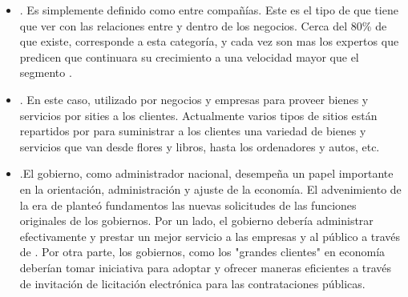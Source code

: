 \begin{itemize}
	\item \textbf{\btob}. Es simplemente definido como \ecommerce entre compañías. Este es el tipo de \ecommerce que tiene que ver con las relaciones entre y dentro de los negocios. Cerca del 80\% de \ecommerce que existe, corresponde a esta categoría, y cada vez son mas los expertos que predicen que \btob \ecommerce continuara su crecimiento a una velocidad mayor que el segmento \btoc.


	\item \textbf{\btoc}. En este caso, \internet utilizado por negocios y empresas para proveer bienes y servicios por sities \web a los clientes. Actualmente varios tipos de sitios \web \btoc están repartidos por \internet para suministrar a los clientes una variedad de bienes y servicios que van desde flores y libros, hasta los ordenadores y autos, etc.

	\item \textbf{\btog}.El gobierno, como administrador nacional, desempeña un papel importante en la orientación, administración y ajuste de la economía. El advenimiento de la era de \ecommerce planteó fundamentos \ecommerce las nuevas solicitudes de las funciones originales de los gobiernos. Por un lado, el gobierno debería  administrar \emarket efectivamente y prestar un mejor servicio a las empresas y al público a través de \egoverment. Por otra parte, los gobiernos, como los "grandes clientes" en economía deberían tomar iniciativa para adoptar \ecommerce y ofrecer maneras eficientes a través de invitación de licitación electrónica para las contrataciones públicas.



\end{itemize}

